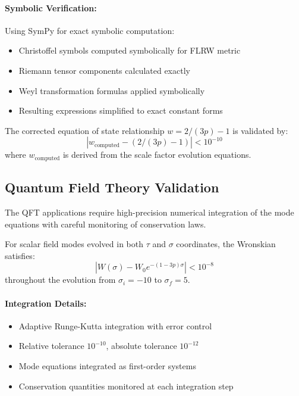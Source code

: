 \paragraph{Symbolic Verification:}
Using SymPy for exact symbolic computation:
\begin{itemize}
\item Christoffel symbols computed symbolically for FLRW metric
\item Riemann tensor components calculated exactly
\item Weyl transformation formulas applied symbolically
\item Resulting expressions simplified to exact constant forms
\end{itemize}

\begin{theorem}
\label{thm:eos_validation}
The corrected equation of state relationship $w = 2/(3p) - 1$ is validated by:
\begin{equation}
|w_{\text{computed}} - (2/(3p) - 1)| < 10^{-10}
\end{equation}
where $w_{\text{computed}}$ is derived from the scale factor evolution equations.
\end{theorem}

\subsection{Quantum Field Theory Validation}
\label{subsec:qft_validation}

The QFT applications require high-precision numerical integration of the mode equations with careful monitoring of conservation laws.

\begin{theorem}
\label{thm:wronskian_conservation_validation}
For scalar field modes evolved in both $\tau$ and $\sigma$ coordinates, the Wronskian satisfies:
\begin{equation}
|W(\sigma) - W_0 e^{-(1-3p)\sigma}| < 10^{-8}
\end{equation}
throughout the evolution from $\sigma_i = -10$ to $\sigma_f = 5$.
\end{theorem}

\paragraph{Integration Details:}
\begin{itemize}
\item Adaptive Runge-Kutta integration with error control
\item Relative tolerance $10^{-10}$, absolute tolerance $10^{-12}$
\item Mode equations integrated as first-order systems
\item Conservation quantities monitored at each integration step
\end{itemize}

